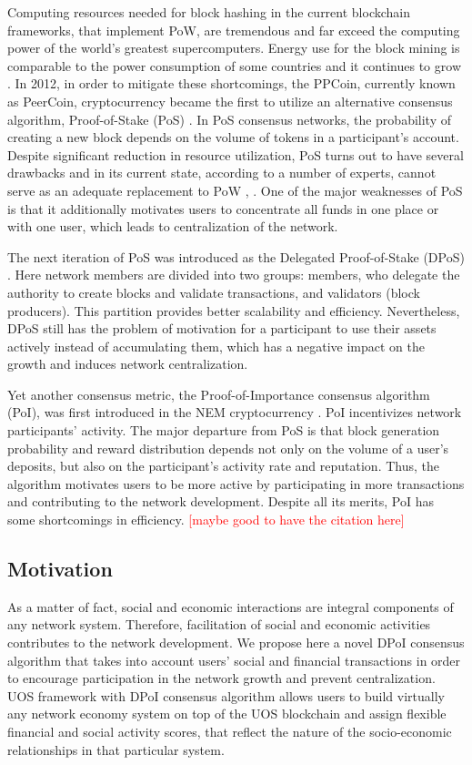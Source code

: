 \documentclass[a4paper,12pt]{article}
\begin{document}
Computing resources needed for block hashing in the current blockchain frameworks, that implement PoW, are tremendous and far exceed the computing power of the world’s greatest supercomputers. Energy use for the block mining is comparable to the power consumption of some countries and it continues to grow \cite{energy}. In 2012, in order to mitigate these shortcomings, the PPCoin, currently  known as PeerCoin, cryptocurrency became the first to utilize an alternative consensus algorithm, Proof-of-Stake (PoS) \cite{Ppcoin}. In PoS consensus networks, the probability of creating a new block depends on the volume of tokens in a participant’s account. Despite significant reduction in resource utilization, PoS turns out to have several drawbacks and in its current state, according to a number of experts, cannot serve as an adequate replacement to PoW \cite{Demeester}, \cite{Poelstra}. One of the major weaknesses of PoS is that it additionally motivates users to concentrate all funds in one place or with one user, which leads to centralization of the network.

The next iteration of PoS was introduced as the Delegated Proof-of-Stake (DPoS) \cite{dantheman}. Here network members are divided into two groups: members, who delegate the authority to create blocks and validate transactions, and validators (block producers). This partition provides better scalability and efficiency. Nevertheless, DPoS still has the problem of motivation for a participant to use their assets actively instead of accumulating them, which has a negative impact on the growth and induces network centralization. 

Yet another consensus metric, the Proof-of-Importance consensus algorithm (PoI), was first introduced in the NEM cryptocurrency \cite{nem}. PoI incentivizes network participants' activity. The major departure from PoS is that block generation probability and reward distribution depends not only on the volume of a user's deposits, but also on the participant's activity rate and reputation. Thus, the algorithm motivates users to be more active by participating in more transactions and contributing to the network development. Despite all its merits, PoI has some shortcomings in efficiency. \textcolor{red}{[maybe good to have the citation here]}


\subsection{Motivation}
As a matter of fact, social and economic interactions are integral components of any network system. Therefore, facilitation of social and economic activities contributes to the network development. We propose here a novel DPoI consensus algorithm that takes into account users' social and financial transactions in order to encourage participation in the network growth and prevent centralization. U{\degree}OS framework with DPoI consensus algorithm allows users to build virtually any network economy system on top of the U{\degree}OS blockchain and assign flexible financial and social activity scores, that reflect the nature of the socio-economic relationships in that particular system. 
\end{document}
